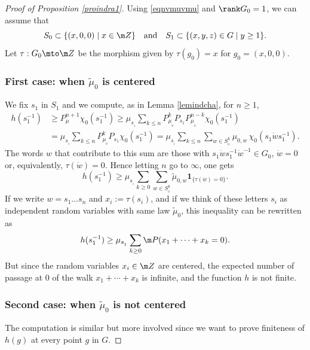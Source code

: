 \begin{proof}[Proof of Proposition \ref{proindra1}]
Using \eqref{eqnvmuvmu} and $\rank G_0=1$, we can assume that
\[
S_0\subset \{ (x,0,0)\mid x\in \m Z\}
\quad\text{and}\quad
S_1\subset \{ (x,y,z)\in G\mid y\geq 1\}.
\]
Let $\tau:G_0\mto \m Z$ be the morphism given by
$\tau(g_0)=x$ for $g_0=(x,0,0)$.

\subsubsection*{First case: when $\widetilde{\mu}_0$ is centered}
We fix $s_1$ in $S_1$ and we compute, as in Lemma \ref{lemindcha}, for $n\geq 1$,
\begin{equation}
\label{eqnhspnch}
\begin{aligned}
h(s_1^{-1})&\geq
P_\mu^{n+1}\chi_0(s_1^{-1})
\geq
\mu_{s_{_1}}\sum_{k\leq n}
P^k_{\mu_{_0}}P_{s_1}P^{n-k}_{\mu_{_0}}\chi_0(s_1^{-1})\\
&=
\mu_{s_{_1}}\sum_{k\leq n}
P^k_{\mu_{_0}}P_{s_1}\chi_0(s_1^{-1})=
\mu_{s_{_1}}\sum_{k\leq n}
\sum_{w\in S_{_0}^k}\mu_{0,w}\,\chi_0(s_1\dot{w}s_1^{-1}).
\end{aligned}
\end{equation}
The words $w$ that contribute to this sum are those with
$s_1\dot{w}s_1^{-1}\dot{w}^{-1}\in G_0$, \ie
$\dot{w} =0$ or, equivalently, $\tau(\dot{w})=0.$
Hence letting $n$ go to $\infty$, one gets
\[
h(s_1^{-1})
\geq
\mu_{s_{_1}}\sum_{k\geq 0}
\sum_{w\in S_{_0}^k}\widetilde{\mu}_{0,w}\mathbf{1}_{\{\tau(\dot{w})=0\}}.
\]
If we write $w=s_1\ldots s_n$ and $x_i:=\tau(s_i)$,
and if we think of these letters $s_i$ as independent random variables with same law $\widetilde{\mu}_0$,
this inequality can be rewritten as
\[
h(s_1^{-1})
\geq
\mu_{s_{_1}}\sum_{k\geq 0}
\m P(x_1+\cdots +x_k=0).
\]
But since the random variables $x_i\in \m Z$ are centered,
the expected number of passage at $0$ of the walk $x_1+\cdots +x_k$ is infinite, and the function $h$ is not finite.

\subsubsection*{Second case: when $\widetilde{\mu}_0$ is not centered}
The computation is similar but more involved since
we want to prove finiteness of $h(g)$ at every point $g$ in $G$.


\end{proof}
